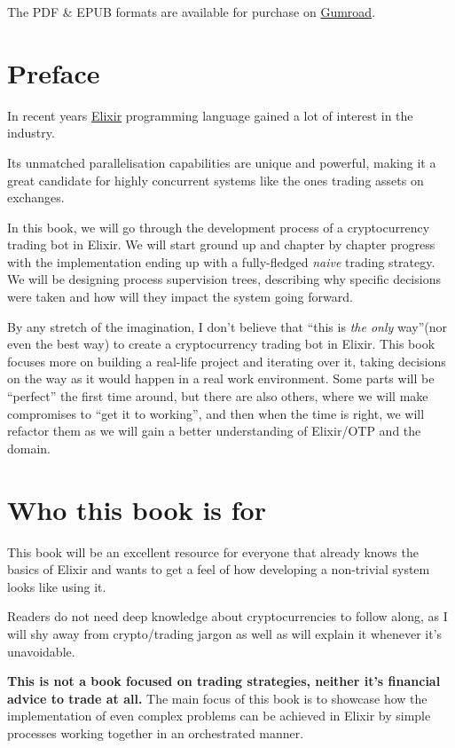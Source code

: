 \documentclass[
  oneside]{book}
\begin{document}
The PDF \& EPUB formats are available for purchase on \href{https://gum.co/cSGdY}{Gumroad}.

\section*{Preface}\label{preface-1}

In recent years \href{https://elixir-lang.org/}{Elixir} programming language gained a lot of interest in the industry.

Its unmatched parallelisation capabilities are unique and powerful, making it a great candidate for highly concurrent systems like the ones trading assets on exchanges.

In this book, we will go through the development process of a cryptocurrency trading bot in Elixir. We will start ground up and chapter by chapter progress with the implementation ending up with a fully-fledged \emph{naive} trading strategy. We will be designing process supervision trees, describing why specific decisions were taken and how will they impact the system going forward.

By any stretch of the imagination, I don't believe that ``this is \emph{the only} way''(nor even the best way) to create a cryptocurrency trading bot in Elixir. This book focuses more on building a real-life project and iterating over it, taking decisions on the way as it would happen in a real work environment. Some parts will be ``perfect'' the first time around, but there are also others, where we will make compromises to ``get it to working'', and then when the time is right, we will refactor them as we will gain a better understanding of Elixir/OTP and the domain.

\section*{Who this book is for}\label{who-this-book-is-for}

This book will be an excellent resource for everyone that already knows the basics of Elixir and wants to get a feel of how developing a non-trivial system looks like using it.

Readers do not need deep knowledge about cryptocurrencies to follow along, as I will shy away from crypto/trading jargon as well as will explain it whenever it's unavoidable.

\textbf{This is not a book focused on trading strategies, neither it's financial advice to trade at all.} The main focus of this book is to showcase how the implementation of even complex problems can be achieved in Elixir by simple processes working together in an orchestrated manner.
\end{document}
